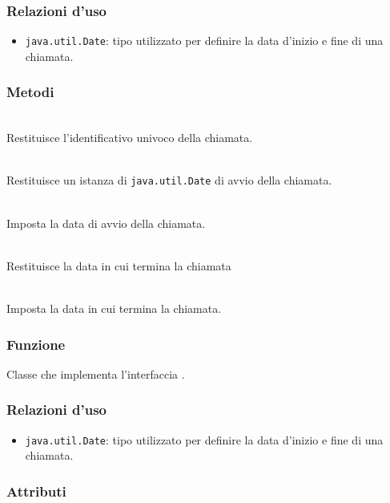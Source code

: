 \subsubsection*{Relazioni d'uso}
\begin{itemize}
	\item \texttt{java.util.Date}: tipo utilizzato per definire la data d'inizio e fine di una chiamata.
\end{itemize}

\subsubsection*{Metodi}
\begin{description}
	\item{}\\
	Restituisce l'identificativo univoco della chiamata.
	\item{}\\
	Restituisce un istanza di \texttt{java.util.Date} di avvio della chiamata.
	\item{}\\
	Imposta la data di avvio della chiamata.
	\item{}\\
	Restituisce la data in cui termina la chiamata
	\item{}\\
	Imposta la data in cui termina la chiamata.
\end{description}


\subsubsection*{Funzione}
Classe che implementa l'interfaccia .

\subsubsection*{Relazioni d'uso}
\begin{itemize}
	\item \texttt{java.util.Date}: tipo utilizzato per definire la data d'inizio e fine di una chiamata.
\end{itemize}

\subsubsection*{Attributi}

